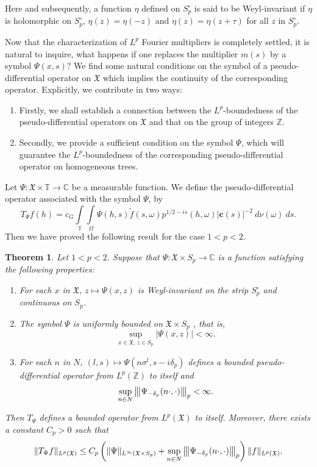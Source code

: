 \documentclass[12pt,reqno]{amsart}
\newcommand{\vertiii}[1]{{\left\vert\kern-0.25ex\left\vert\kern-0.25ex\left\vert #1 
		\right\vert\kern-0.25ex\right\vert\kern-0.25ex\right\vert}}
\newtheorem{theorem}{Theorem}[section]
\theoremstyle{definition}
\theoremstyle{definition}
\numberwithin{equation}{section}
\begin{document}
\noindent Here and subsequently, a function $\eta$ defined on $S^{\circ}_{p}$ is said to be Weyl-invariant if $\eta$ is holomorphic on $S^{\circ}_{p}$, $\eta(z)=\eta(-z)$ and $\eta(z)=\eta(z+\tau)$ for all $z$ in $S^{\circ}_{p}$.

Now that the characterization of  $ L^p $ Fourier multipliers is completely settled, it is natural to inquire, what happens if one replaces the multiplier $ m(s) $ by a symbol $ \Psi(x,s)? $ We find some natural conditions on the symbol of a pseudo-differential operator on $\mathfrak{X}$ which implies the continuity of the corresponding operator. Explicitly, we contribute in two ways:
\begin{enumerate}
\item  Firstly, we shall establish a connection between the $L^{p}$-boundedness of the pseudo-differential operators on $\mathfrak{X}$ and that on the group of integers $\mathbb{Z}$. 
\item  Secondly, we provide a sufficient condition on the symbol $\Psi$, which will guarantee the $L^p$-boundedness of the corresponding pseudo-differential operator on homogeneous trees.
\end{enumerate} Let $\Psi:\mathfrak{X}\times\mathbb{T}\rightarrow\mathbb{C}$ be a measurable function. We define the pseudo-differential operator associated with the symbol $\Psi$, by
\begin{equation}\label{pdotree}
	T_{\Psi}f(h)=c_{G}\int\limits_{\mathbb{T}}\int\limits_{\Omega}\Psi(h,s)\widetilde{f}(s,\omega)p^{1/2-is}(h,\omega)|\mathbf{c}(s)|^{-2}~d\nu(\omega)~ds.
\end{equation}
Then we have proved the following result for the case $1<p<2$. 
\begin{theorem}\label{mainresult1}
	Let $1<p<2$. Suppose that $\Psi:\mathfrak{X}\times S_{p}\rightarrow\mathbb{C}$ is a function satisfying the following properties:
\begin{enumerate}
\item For each $x$ in $\mathfrak{X}$, $z\mapsto\Psi(x,z)$ is Weyl-invariant on the strip $S^{\circ}_{p}$ and continuous on $S_{p}$.
\item The symbol $\Psi$ is uniformly bounded on $\mathfrak{X}\times S_{p}$ , that is,
$$\sup\limits_{x\in\mathfrak{X},\,z\in S_{p}}|\Psi(x,z)|<\infty.$$
\item For each $n$ in $N$, $(l,s) \mapsto \Psi(n\sigma^{l},s-i\delta_{p})$ defines a bounded pseudo-differential operator from $L^{p}(\mathbb{Z})$ to itself and
$$\sup\limits_{n\in N}\vertiii{\Psi_{-\delta_{p}}(n\cdot,\cdot)}_{p}<\infty.$$
\end{enumerate}
Then $T_{\Psi}$ defines a bounded operator from $L^{p}(\mathfrak{X})$ to itself. Moreover, there exists a constant $C_{p}>0$ such that
$$\|T_{\Psi}f\|_{L^{p}(\mathfrak{X})}\leq C_{p}\left(\|\Psi\|_{L^{\infty}(\mathfrak{X}\times S_{p})}+\sup\limits_{n\in N}\vertiii{\Psi_{-\delta_{p}}(n\cdot,\cdot)}_{p}\right)\|f\|_{L^{p}(\mathfrak{X})}.$$
\end{theorem}
\end{document}
